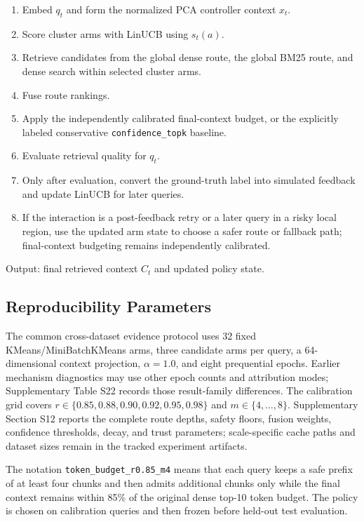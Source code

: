 \begin{enumerate}
\item Embed $q_t$ and form the normalized PCA controller context $x_t$.
\item Score cluster arms with LinUCB using $s_t(a)$.
\item Retrieve candidates from the global dense route, the global BM25 route, and dense search within selected cluster arms.
\item Fuse route rankings.
\item Apply the independently calibrated final-context budget, or the explicitly labeled conservative \nolinkurl{confidence_topk} baseline.
\item Evaluate retrieval quality for $q_t$.
\item Only after evaluation, convert the ground-truth label into simulated feedback and update LinUCB for later queries.
\item If the interaction is a post-feedback retry or a later query in a risky local region, use the updated arm state to choose a safer route or fallback path; final-context budgeting remains independently calibrated.
\end{enumerate}

Output: final retrieved context $C_t$ and updated policy state.

\subsection{Reproducibility Parameters}
\label{sec:04-method:reproducibility-parameters}

The common cross-dataset evidence protocol uses 32 fixed KMeans/MiniBatchKMeans arms, three candidate arms per query, a 64-dimensional context projection, $\alpha=1.0$, and eight prequential epochs. Earlier mechanism diagnostics may use other epoch counts and attribution modes; Supplementary Table S22 records those result-family differences. The calibration grid covers $r \in \{0.85,0.88,0.90,0.92,0.95,0.98\}$ and $m \in \{4,\ldots,8\}$. Supplementary Section S12 reports the complete route depths, safety floors, fusion weights, confidence thresholds, decay, and trust parameters; scale-specific cache paths and dataset sizes remain in the tracked experiment artifacts.

The notation \nolinkurl{token_budget_r0.85_m4} means that each query keeps a safe prefix of at least four chunks and then admits additional chunks only while the final context remains within 85\% of the original dense top-10 token budget. The policy is chosen on calibration queries and then frozen before held-out test evaluation.
